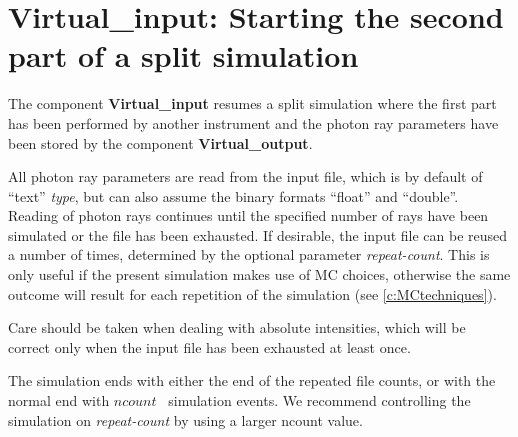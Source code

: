 \section{Virtual\_input: Starting the second part of a split simulation}
\label{s:virtual-input}

The component \textbf{Virtual\_input} resumes a split simulation where the
first part has been performed by another instrument and the photon ray
parameters have been stored by the component \textbf{Virtual\_output}.

All photon ray parameters are read from the input file, which is by default
of ``text'' \textit{type}, but can also assume the binary formats
``float'' and ``double''. Reading of photon rays continues until the
specified number of rays have been simulated or
the file has been exhausted. If desirable, the input file
can be reused a number of times, determined by the optional parameter
\textit{repeat-count}. This is only useful if the present simulation makes use of
MC choices, otherwise the same outcome will result for each repetition of the
simulation (see \cref{c:MCtechniques}).

Care should be taken when dealing with
absolute intensities, which will be correct only
when the input file has been exhausted at least once.

The simulation ends with either the end of the repeated file counts,
or with the normal end with $ncount$ \MCX\ simulation events. We recommend
controlling the simulation on \textit{repeat-count} by using
a larger ncount value.
